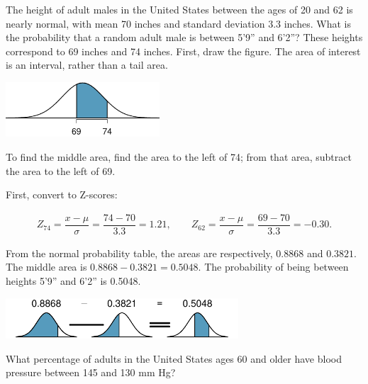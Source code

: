 \begin{examplewrap}
\begin{nexample}{The height of adult males in the United States between the ages of 20 and 62 is nearly normal, with mean 70 inches and standard deviation 3.3 inches.\footnotemark{} What is the probability that a random adult male is between 5'9'' and 6'2''?}
	These heights correspond to 69 inches and 74 inches. First, draw the figure. The area of interest is an interval, rather than a tail area.
	\begin{center}
		\includegraphics[width=0.43\textwidth]{ch_distributions_oi_biostat/figures/between59And62/between59And62}
	\end{center}
	To find the middle area, find the area to the left of 74; from that area, subtract the area to the left of 69.
	
	First, convert to Z-scores:
	
	\begin{align*}
	Z_{74} = \dfrac{x-\mu}{\sigma} = \dfrac{74-70}{3.3} = 1.21, \qquad Z_{62} = \dfrac{x-\mu}{\sigma} = \dfrac{69-70}{3.3} = -0.30.
	\end{align*}
	
	From the normal probability table, the areas are respectively, $0.8868$ and $0.3821$. The middle area is $0.8868 - 0.3821 = 0.5048$. The probability of being between heights 5'9'' and 6'2'' is 0.5048.
	\begin{center}
		\includegraphics[width=0.65\textwidth]{ch_distributions_oi_biostat/figures/subtracting2Areas/subtracting2Areas}
	\end{center}
\end{nexample}
\end{examplewrap}

\begin{exercisewrap}
\begin{nexercise}
What percentage of adults in the United States ages 60 and older have blood pressure between 145 and 130 mm Hg?\footnotemark{}
\end{nexercise}
\end{exercisewrap}


